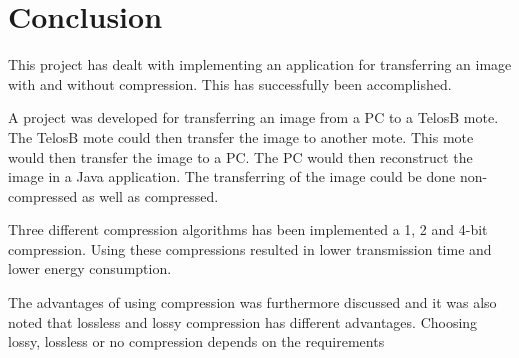 \chapter{Conclusion}
\label{chp:conc}

This project has dealt with implementing an application for transferring an image with and without compression. This has successfully been accomplished.

A project was developed for transferring an image from a PC to a TelosB mote. The TelosB mote could then transfer the image to another mote. This mote would then transfer the image to a PC. The PC would then reconstruct the image in a Java application. The transferring of the image could be done non-compressed as well as compressed. 

Three different compression algorithms has been implemented a 1, 2 and 4-bit compression. Using these compressions resulted in lower transmission time and lower energy consumption.  

The advantages of using compression was furthermore discussed and it was also noted that lossless and lossy compression has different advantages. Choosing lossy, lossless or no compression depends on the requirements